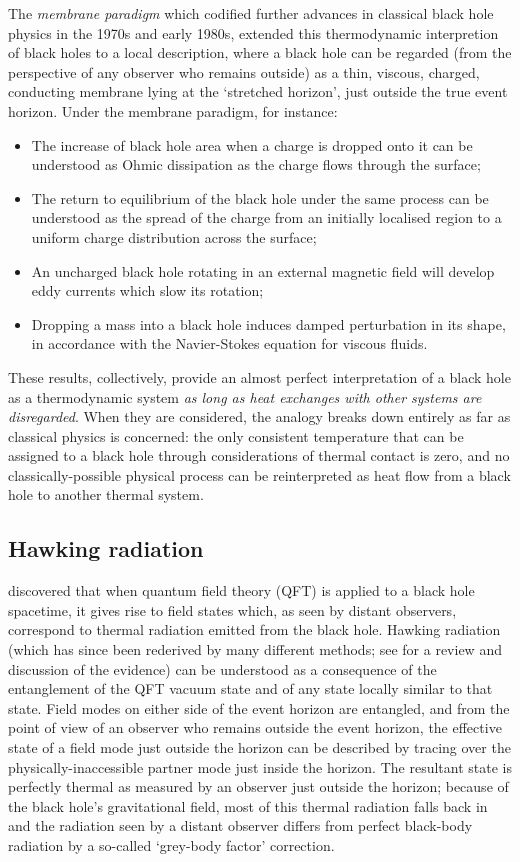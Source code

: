 \documentclass[12pt]{article}
\begin{document}
The \emph{membrane paradigm} \cite{membraneparadigm} which codified further advances in classical black hole physics in the 1970s and early 1980s, extended this thermodynamic interpretion of black holes to a local description, where a black hole can be regarded (from the perspective of any observer who remains outside) as a thin, viscous, charged, conducting membrane lying at the `stretched horizon', just outside the true event horizon. Under the membrane paradigm, for instance:
\begin{itemize}
\item The increase of black hole area when a charge is dropped onto it can be understood as Ohmic dissipation as the charge flows through the surface;
\item The return to equilibrium of the black hole under the same process can be understood as the spread of the charge from an initially localised region to a uniform charge distribution across the surface;
\item An uncharged black hole rotating in an external magnetic field will develop eddy currents which slow its rotation;
\item Dropping a mass into a black hole induces damped perturbation in its shape, in accordance with the Navier-Stokes equation for viscous fluids.
\end{itemize}
These results, collectively, provide an almost perfect interpretation of a black hole as a thermodynamic system \emph{as long as heat exchanges with other systems are disregarded}. When they are considered, the analogy breaks down entirely as far as classical physics is concerned: the only consistent temperature that can be assigned to a black hole through considerations of thermal contact is zero, and no classically-possible physical process can be reinterpreted as heat flow from a black hole to another thermal system.

\subsection{Hawking radiation}

 discovered that when quantum field theory (QFT) is applied to a black hole spacetime, it gives rise to field states which, as seen by distant observers, correspond to thermal radiation emitted from the black hole. Hawking radiation (which has since been rederived by many different methods; see  for a review and discussion of the evidence) can be understood as a consequence of the entanglement of the QFT
vacuum state and of any state locally similar to that state. Field modes on either side of the event horizon are entangled, and from the point of view of an observer who remains outside the event horizon, the effective state of a field mode just outside the horizon can be described by tracing over the physically-inaccessible partner mode just inside the horizon. The resultant state is perfectly thermal as measured by an observer just outside the horizon; because of the black hole's gravitational field, most of this thermal radiation falls back in and the radiation seen by a distant observer differs from perfect black-body radiation by a so-called `grey-body factor' correction.
\end{document}
